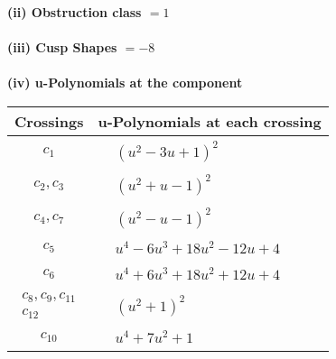 \documentclass[1p]{elsarticle_modified}
\theoremstyle{definition}
\begin{document}
\flushleft \textbf{(ii) Obstruction class $= 1$}\\~\\
\flushleft \textbf{(iii) Cusp Shapes $= -8$}\\~\\
\newpage\renewcommand{\arraystretch}{1}
\flushleft \textbf{(iv) u-Polynomials at the component}\newline \\
\begin{tabular}{m{50pt}|m{274pt}}
Crossings & \hspace{64pt}u-Polynomials at each crossing \\
\hline $$\begin{aligned}c_{1}\end{aligned}$$&$\begin{aligned}
&(u^2-3 u+1)^2
\end{aligned}$\\
\hline $$\begin{aligned}c_{2},c_{3}\end{aligned}$$&$\begin{aligned}
&(u^2+u-1)^2
\end{aligned}$\\
\hline $$\begin{aligned}c_{4},c_{7}\end{aligned}$$&$\begin{aligned}
&(u^2- u-1)^2
\end{aligned}$\\
\hline $$\begin{aligned}c_{5}\end{aligned}$$&$\begin{aligned}
&u^4-6 u^3+18 u^2-12 u+4
\end{aligned}$\\
\hline $$\begin{aligned}c_{6}\end{aligned}$$&$\begin{aligned}
&u^4+6 u^3+18 u^2+12 u+4
\end{aligned}$\\
\hline $$\begin{aligned}c_{8},c_{9},c_{11}\\c_{12}\end{aligned}$$&$\begin{aligned}
&(u^2+1)^2
\end{aligned}$\\
\hline $$\begin{aligned}c_{10}\end{aligned}$$&$\begin{aligned}
&u^4+7 u^2+1
\end{aligned}$\\
\hline
\end{tabular}\\~\\
\end{document}
